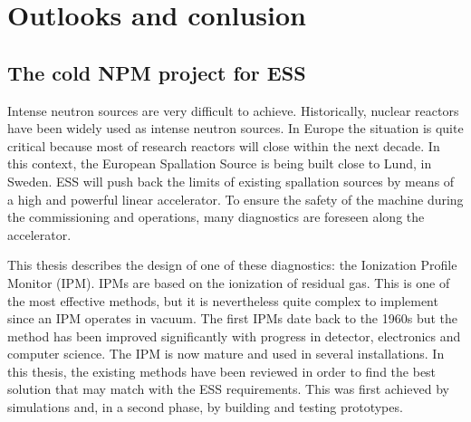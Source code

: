 \chapter{Outlooks and conlusion}
\cleardoublepage

\minitoc
\section*{The cold NPM project for ESS}

Intense neutron sources are very difficult to achieve. Historically, nuclear reactors have been widely used as intense neutron sources. In Europe the situation is quite critical because most of research reactors will close within the next decade. In this context, the European Spallation Source is being built close to Lund, in Sweden. ESS will push back the limits of existing spallation sources by means of a high and powerful linear accelerator. To ensure the safety of the machine during the commissioning and operations, many diagnostics are foreseen along the accelerator.

This thesis describes the design of one of these diagnostics: the Ionization Profile Monitor (IPM). IPMs are based on the ionization of residual gas. This is one of the most effective methods, but it is nevertheless quite complex to implement since an IPM operates in vacuum. The first IPMs date back to the 1960s but the method has been improved significantly with progress in detector, electronics and computer science. The IPM is now mature and used in several installations. In this thesis, the existing methods have been reviewed in order to find the best solution that may match with the ESS requirements. This was first achieved by simulations and, in a second phase, by building and testing prototypes.

